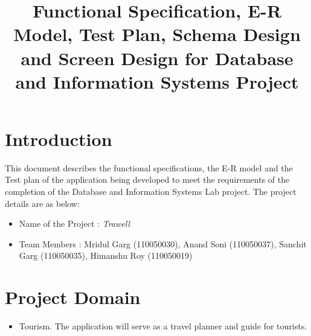 \documentclass[a4paper,11pt]{article}
\title{Functional Specification, E-R Model, Test Plan, Schema Design and Screen Design for Database and Information Systems Project}
\begin{document}
\maketitle
\section{Introduction}
This document describes the functional specifications, the E-R model and the Test plan of the application being developed to meet the requirements of the completion of the Database and Information Systems Lab project. The project details are as below: 
\begin{itemize}
\item Name of the Project : \emph{Trawell}
\item Team Members : Mridul Garg (110050030), Anand Soni (110050037), Sanchit Garg (110050035), Himanshu Roy (110050019) 
\end{itemize}

\section{Project Domain}
\begin{itemize}
\item Tourism. The application will serve as a travel planner and guide for tourists. 
\end{itemize}
\end{document}
